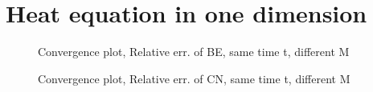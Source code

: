\section{Heat equation in one dimension}

\begin{figure}[h]
    \centering
    
    \caption{Convergence plot, Relative err. of BE, same time t, different M}
\end{figure}

\begin{figure}[h]
    \centering
    
    \caption{Convergence plot, Relative err. of CN, same time t, different M}
\end{figure}
